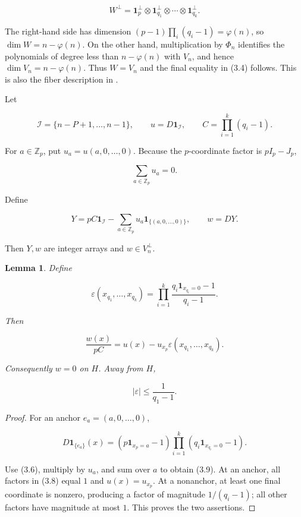 \documentclass[11pt]{article}
\newtheorem{lemma}[theorem]{Lemma}
\numberwithin{equation}{section}
\begin{document}
\nopagebreak[4]
\[
W^\perp=
\mathbf1_p^\perp\otimes
\mathbf1_{q_1}^\perp\otimes\cdots\otimes
\mathbf1_{q_k}^\perp.
\]

The right-hand side has dimension
\((p-1)\prod_i(q_i-1)=\varphi(n)\), so
\(\dim W=n-\varphi(n)\). On the other hand, multiplication by \(\Phi_n\)
identifies the polynomials of degree less than \(n-\varphi(n)\) with \(V_n\),
and hence \(\dim V_n=n-\varphi(n)\). Thus \(W=V_n\) and the final equality
in (3.4) follows. This is also the fiber description in \cite[Section 2, pp. 5--7]{steinberger2012}.

Let

\nopagebreak[4]
\[
\mathcal I=\{n-P+1,\ldots,n-1\},
\qquad
u=D\mathbf1_{\mathcal I},
\qquad
C=\prod_{i=1}^k(q_i-1).
\tag{3.5}
\]

For \(a\in\mathbb Z_p\), put \(u_a=u(a,0,\ldots,0)\). Because the
\(p\)-coordinate factor is \(pI_p-J_p\),

\nopagebreak[4]
\[
\sum_{a\in\mathbb Z_p}u_a=0.
\tag{3.6}
\]

Define

\nopagebreak[4]
\[
Y=pC\mathbf1_{\mathcal I}
-\sum_{a\in\mathbb Z_p}
u_a\mathbf1_{\{(a,0,\ldots,0)\}},
\qquad
w=DY.
\tag{3.7}
\]

Then \(Y,w\) are integer arrays and \(w\in V_n^\perp\).

\Needspace{0.28\textheight}
\begin{lemma}

Define

\nopagebreak[4]
\[
\varepsilon(x_{q_1},\ldots,x_{q_k})
=
\prod_{i=1}^k
\frac{q_i\mathbf1_{x_{q_i}=0}-1}{q_i-1}.
\tag{3.8}
\]

Then

\nopagebreak[4]
\[
\frac{w(x)}{pC}
=u(x)-u_{x_p}\varepsilon(x_{q_1},\ldots,x_{q_k}).
\tag{3.9}
\]

Consequently \(w=0\) on \(H\). Away from \(H\),

\nopagebreak[4]
\[
|\varepsilon|\leq\frac1{q_1-1}.
\tag{3.10}
\]

\end{lemma}

\begin{proof}

For an anchor \(e_a=(a,0,\ldots,0)\),

\nopagebreak[4]
\[
D\mathbf1_{\{e_a\}}(x)
=
(p\mathbf1_{x_p=a}-1)
\prod_{i=1}^k(q_i\mathbf1_{x_{q_i}=0}-1).
\tag{3.11}
\]

Use (3.6), multiply by \(u_a\), and sum over \(a\) to obtain (3.9).
At an anchor, all factors in (3.8) equal \(1\) and \(u(x)=u_{x_p}\).
At a nonanchor, at least one final coordinate is nonzero, producing a factor
of magnitude \(1/(q_i-1)\); all other factors have magnitude at most \(1\).
This proves the two assertions.
\end{proof}
\end{document}
